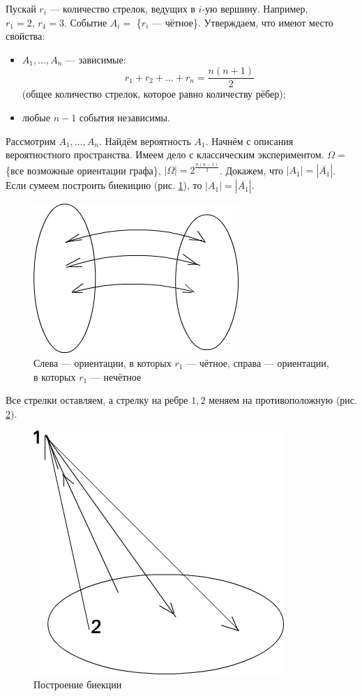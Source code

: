 Пускай $r_i$ --- количество стрелок, ведущих в $i$-ую вершину.
Например, $r_1 = 2, \, r_4 = 3$.
Событие $A_i =$ \{$r_i$ --- чётное\}.
Утверждаем, что имеют место свойства:
\begin{itemize}
\item $A_1, \dotsc, A_n$ --- зависимые:
$$r_1 + r_2 + \dotsc + r_n =
\frac{n \left( n+1 \right) }{2}$$
(общее количество стрелок, которое равно количеству рёбер);
\item любые $n - 1$ события независимы.
\end{itemize}

Рассмотрим $A_1, \dotsc, A_n$.
Найдём вероятность $A_1$.
Начнём с описания вероятностного пространства.
Имеем дело с классическим экспериментом.
$ \Omega =$ \{все возможные ориентации графа\}, $ \left| \Omega \right| = 2^{ \frac{n \left( n-1 \right) }{2} }$.
Докажем, что $ \left| A_1 \right| = \left| \overline{A_1} \right| $.
Если сумеем построить биекицию (рис. \ref{fig:5141}), то $ \left| A_1 \right| = \left| \overline{A_1} \right| $.

\begin{figure}[h!]
  \centering
  \includegraphics[width=.4\textwidth]{./pictures/5_14_1.png}
  \caption{Слева --- ориентации, в которых $r_1$ --- чётное, справа --- ориентации, в которых $r_1$ --- нечётное}
  \label{fig:5141}
\end{figure}

Все стрелки оставляем, а стрелку на ребре $1, 2$ меняем на противоположную (рис. \ref{fig:5142}).

\begin{figure}[h!]
  \centering
  \includegraphics[width=.4\textwidth]{./pictures/5_14_2.png}
  \caption{Построение биекции}
  \label{fig:5142}
\end{figure}

